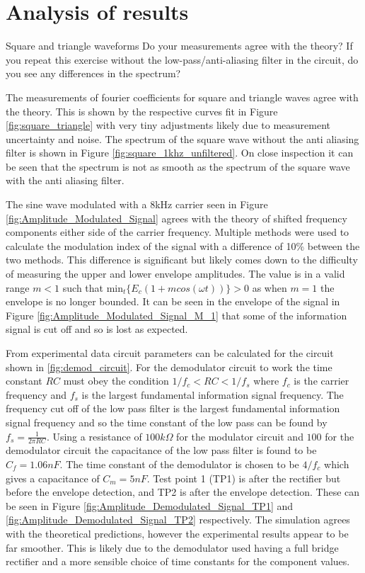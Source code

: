 \documentclass[12pt]{article}
\begin{document}
\section{Analysis of results}

Square and triangle waveforms
Do your measurements
agree with the theory? If you repeat this exercise without the low-pass/anti-aliasing filter in
the circuit, do you see any differences in the spectrum?

The measurements of fourier coefficients for square and triangle waves agree with the theory.
This is shown by the respective curves fit in Figure \ref{fig:square_triangle} with very tiny adjustments likely due to measurement uncertainty and noise.
The spectrum of the square wave without the anti aliasing filter is shown in Figure \ref{fig:square_1khz_unfiltered}.
On close inspection it can be seen that the spectrum is not as smooth as the spectrum of the square wave with the anti aliasing filter.

The sine wave modulated with a 8kHz carrier seen in Figure \ref{fig:Amplitude_Modulated_Signal} agrees with the theory of shifted frequency components either side of the carrier frequency.
Multiple methods were used to calculate the modulation index of the signal with a difference of 10\% between the two methods.
This difference is significant but likely comes down to the difficulty of measuring the upper and lower envelope amplitudes.
The value is in a valid range $m < 1$ such that $\text{min}_t\{E_c(1+m cos(\omega t))\} > 0$ as when $m=1$ the envelope is no longer bounded.
It can be seen in the envelope of the signal in Figure \ref{fig:Amplitude_Modulated_Signal_M_1} that some of the information signal is cut off and so is lost as expected.

From experimental data circuit parameters can be calculated for the circuit shown in \ref{fig:demod_circuit}.
For the demodulator circuit to work the time constant $RC$ must obey the condition $1/f_c < RC < 1/f_s$ where $f_c$ is the carrier frequency and $f_s$ is the largest fundamental information signal frequency.
The frequency cut off of the low pass filter is the largest fundamental information signal frequency and so the time constant of the low pass can be found by $f_s = \frac{1}{2\pi RC}$.
Using a resistance of $100k\Omega$ for the modulator circuit and $100$ for the demodulator circuit the capacitance of the low pass filter is found to be $C_f=1.06nF$.
The time constant of the demodulator is chosen to be $4/f_c$ which gives a capacitance of $C_m=5nF$.
Test point 1 (TP1) is after the rectifier but before the envelope detection, and TP2 is after the envelope detection.
These can be seen in Figure \ref{fig:Amplitude_Demodulated_Signal_TP1} and \ref{fig:Amplitude_Demodulated_Signal_TP2} respectively.
The simulation agrees with the theoretical predictions, however the experimental results appear to be far smoother.
This is likely due to the demodulator used having a full bridge rectifier and a more sensible choice of time constants for the component values.
\end{document}
